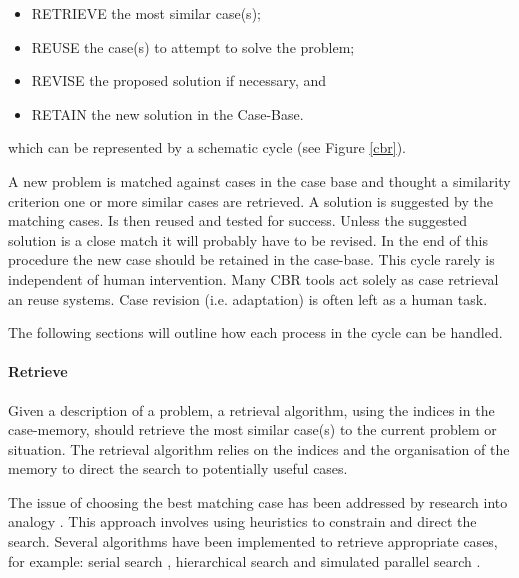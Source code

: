 \begin{itemize}
  \item RETRIEVE the most similar case(s);
  \item REUSE the case(s) to attempt to solve the problem;
  \item REVISE the proposed solution if necessary, and
  \item RETAIN the new solution in the Case-Base.
\end{itemize}
which can be represented by a schematic cycle (see Figure \ref{cbr}).



A new problem is matched against cases in the case base and thought a similarity 
criterion one or more similar cases are retrieved. A solution is suggested by the 
matching cases. Is then reused and tested for success. Unless the suggested solution 
is a close match it will probably have to be revised. In the end of this procedure the 
new case should be retained in the case-base. This cycle rarely is independent of 
human intervention. Many CBR tools act solely as case retrieval an reuse systems. 
Case revision (i.e. adaptation) is often left as a human task.   

The following sections will outline how each process in the cycle can be handled.

\paragraph{Retrieve}
\label{Retrieve} 
Given a description of a problem, a retrieval algorithm, using the indices in the case-memory, 
should retrieve the most similar case(s) to the current problem or situation. The retrieval algorithm 
relies on the indices and the organisation of the memory to direct the search to potentially useful cases.

The issue of choosing the best matching case has been addressed by research into analogy \cite{Falkenehainer_1986}. 
This approach involves using heuristics to constrain and direct the search. Several algorithms have 
been implemented to retrieve appropriate cases, for example: serial search 
\cite{Navinchandar_1991, Acorn_Walden_1992, Simoudis_93}, hierarchical search 
\cite{Maher_Zhang_1991} and simulated parallel search \cite{Domeshek_1993}.

